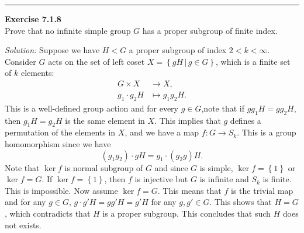 \documentclass[a4paper, 12pt]{article}
\newenvironment{problem}[2][Exercise]
    { \begin{mdframed}[backgroundcolor=gray!20] \textbf{#1 #2} \\}
    {  \end{mdframed}}
\newenvironment{solution}
    {\textit{Solution:}}
    {}
\begin{document}
\noindent\rule{7in}{2.8pt}
\begin{problem}{7.1.8}
Prove that no infinite simple group \(G\) has a proper subgroup of finite index.
\end{problem}
\begin{solution}
Suppose we have \(H<G\) a proper subgroup of index \(2<k<\infty\). Consider \(G\) acts on the set of left coset \(X=\left\{ gH\,|\, g\in G \right\}\), which is a 
finite set of \(k\) elements: 
\begin{align*}
    G\times X&\rightarrow X,\\ 
    g_1\cdot g_2H&\mapsto g_1g_2H. 
\end{align*}
This is a well-defined group action and for every \(g\in G\),note that if \(g g_1H=g g_2H\), then \(g_1H=g_2H\) is the same element in \(X\). This implies that \(g\) defines a permutation of the elements in \(X\), and 
we have a map \(f:G\rightarrow S_k\). This is a group homomorphism since we have 
\[(g_1g_2)\cdot gH=g_1 \cdot (g_2g)H.\]
Note that \(\ker f\) is normal subgroup of \(G\) and since \(G\) is simple, \(\ker f=\left\{ 1 \right\}\) or \(\ker f=G\). If \(\ker f=\left\{ 1 \right\}\), then \(f\) is injective but \(G\) is infinite and \(S_k\) is finite. This is impossible. 
Now assume \(\ker f=G\). This means that \(f\) is the trivial map and for any \(g\in G\), \(g\cdot g'H=gg'H=g'H\) for any \(g,g'\in G\). This shows that \(H=G\), which contradicts that \(H\) is a proper subgroup. This concludes that such \(H\) does not exists.  
\end{solution}
\end{document}
